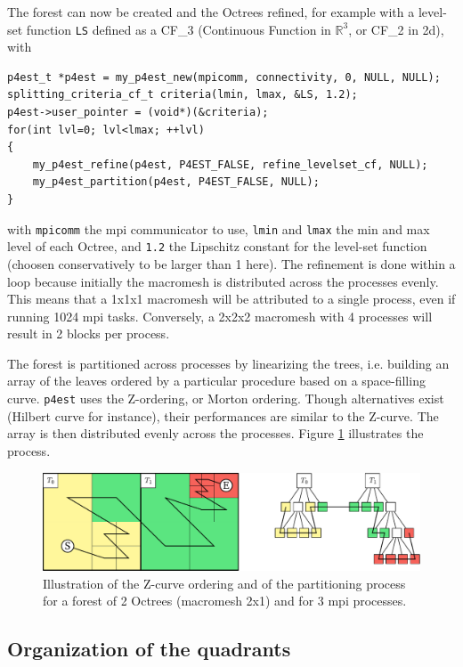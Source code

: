 \documentclass{article}
\newcommand{\ttt}[1]{\texttt{#1}}
\newcommand{\figb}{\begin{figure}[htbp]\begin{center}}
\newcommand{\fige}{\end{center}\end{figure}}
\begin{document}
The forest can now be created and the Octrees refined, for example with a level-set function \ttt{LS} defined as a CF\_3 (Continuous Function in $\mathbb{R}^3$, or CF\_2 in 2d), with
\begin{Verbatim}[frame=single]
p4est_t *p4est = my_p4est_new(mpicomm, connectivity, 0, NULL, NULL);
splitting_criteria_cf_t criteria(lmin, lmax, &LS, 1.2);
p4est->user_pointer = (void*)(&criteria);
for(int lvl=0; lvl<lmax; ++lvl)
{
	my_p4est_refine(p4est, P4EST_FALSE, refine_levelset_cf, NULL);
	my_p4est_partition(p4est, P4EST_FALSE, NULL);
}
\end{Verbatim}
with \ttt{mpicomm} the mpi communicator to use, \ttt{lmin} and \ttt{lmax} the min and max level of each Octree, and \ttt{1.2} the Lipschitz constant for the level-set function (choosen conservatively to be larger than 1 here). The refinement is done within a loop because initially the macromesh is distributed across the processes evenly. This means that a 1x1x1 macromesh will be attributed to a single process, even if running 1024 mpi tasks. Conversely, a 2x2x2 macromesh with 4 processes will result in 2 blocks per process.

The forest is partitioned across processes by linearizing the trees, i.e. building an array of the leaves ordered by a particular procedure based on a space-filling curve. \ttt{p4est} uses the Z-ordering, or Morton ordering. Though alternatives exist (Hilbert curve for instance), their performances are similar to the Z-curve. The array is then distributed evenly across the processes. Figure \ref{fig::zcurve} illustrates the process.
\figb
\includegraphics[width=.9\textwidth]{p4est_zcurve.pdf}
\caption{Illustration of the Z-curve ordering and of the partitioning process for a forest of 2 Octrees (macromesh 2x1) and for 3 mpi processes.} \label{fig::zcurve}
\fige


\subsection{Organization of the quadrants}
\end{document}
